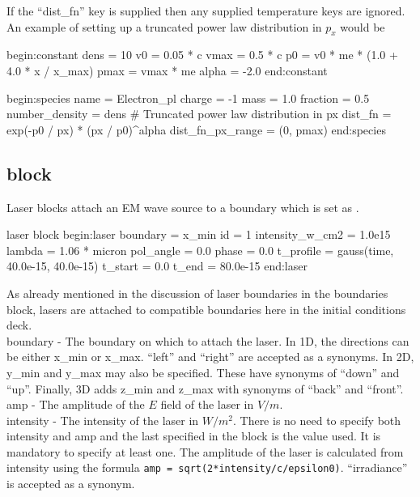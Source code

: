 If the ``dist\_fn'' key is supplied then any supplied temperature keys are
ignored.  An example of setting up a truncated power law distribution in
$p_x$ would be
\begin{boxverbatim}
begin:constant
  dens = 10
  v0 = 0.05 * c
  vmax = 0.5 * c
  p0 = v0 * me * (1.0 + 4.0 * x / x_max)
  pmax = vmax * me
  alpha = -2.0
end:constant

begin:species
  name = Electron_pl
  charge = -1
  mass = 1.0
  fraction = 0.5
  number_density = dens
  # Truncated power law distribution in px
  dist_fn = exp(-p0 / px) * (px / p0)^alpha
  dist_fn_px_range = (0, pmax)
end:species
\end{boxverbatim}


\subsection{\texorpdfstring
  { block}
  {           {laser} block}}
\label{sec:laser_block}
Laser blocks attach an EM wave source to a boundary which is set as
.
\begin{lboxverbatim}{laser block}
begin:laser
   boundary = x_min
   id = 1
   intensity_w_cm2 = 1.0e15
   lambda = 1.06 * micron
   pol_angle = 0.0
   phase = 0.0
   t_profile = gauss(time, 40.0e-15, 40.0e-15)
   t_start = 0.0
   t_end = 80.0e-15
end:laser
\end{lboxverbatim}

As already mentioned in the discussion of laser boundaries in the boundaries
block, lasers are attached to compatible boundaries here in the initial
conditions deck.\\

{\emphtext boundary} - The boundary on which to attach the laser.
  In 1D, the directions can be either x\_min or x\_max.  ``left'' and ``right''
  are accepted as a synonyms. In 2D, y\_min and y\_max may also be specified.
  These have synonyms of ``down'' and ``up''. Finally, 3D adds z\_min and z\_max
  with synonyms of ``back'' and ``front''.\\

{\emphtext amp} - The amplitude of the $E$ field of the laser in $V/m$.\\

{\emphtext intensity} - The intensity of the laser in $W/m^2$.
  There is no need to specify both intensity and amp and the last specified
  in the block is the value used. It is mandatory to specify at least one.
  The amplitude of the laser is calculated from intensity using the formula
  \verb|amp = sqrt(2*intensity/c/epsilon0)|.
  ``irradiance'' is accepted as a synonym.\\

